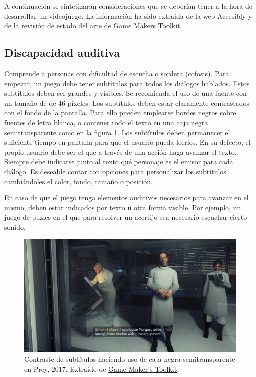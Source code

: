 A continuación se sintetizarán consideraciones que se deberían tener a la hora de desarrollar un videojuego. La información ha sido extraida de la web Accesibly\cite{accesibly} y de la revisión de estado del arte de Game Makers Toolkit\cite{gmtk-accesibility}.

\subsection{Discapacidad auditiva}

Comprende a personas con dificultad de escucha o sordera (cofosis). Para empezar, un juego debe tener subtítulos para todos los diálogos hablados. Estos subtítulos deben ser grandes y visibles. Se recomienda el uso de una fuente con un tamaño de de 46 píxeles. Los subtítulos deben estar claramente contrastados con el fondo de la pantalla. Para ello pueden emplearse bordes negros sobre fuentes de letra blanca, o contener todo el texto en una caja negra semitransparente como en la figura \ref{fig:gmtk-subtitles}. Los subtítulos deben permanecer el suficiente tiempo en pantalla para que el usuario pueda leerlos. En su defecto, el propio usuario debe ser el que a través de una acción haga avanzar el texto. Siempre debe indicarse junto al texto qué personaje es el emisor para cada diálogo. Es deseable contar con opciones para personalizar los subtítulos cambiándoles el color, fondo, tamaño o posición.

En caso de que el juego tenga elementos auditivos necesarios para avanzar en el mismo, deben estar indicados por texto u otra forma visible. Por ejemplo, un juego de puzles en el que para resolver un acertijo sea necesario escuchar cierto sonido.

\begin{figure}[h]
    \centering
    \includegraphics[scale=0.28]{img/gmtk-subtitles.png}
    \caption[Contraste de subtítulos en Prey]{Contraste de subtítulos haciendo uso de caja negra semitransparente en Prey, 2017. Extraido de \href{https://www.youtube.com/@GMTK}{Game Maker's Toolkit}.}
    \label{fig:gmtk-subtitles}
\end{figure}

